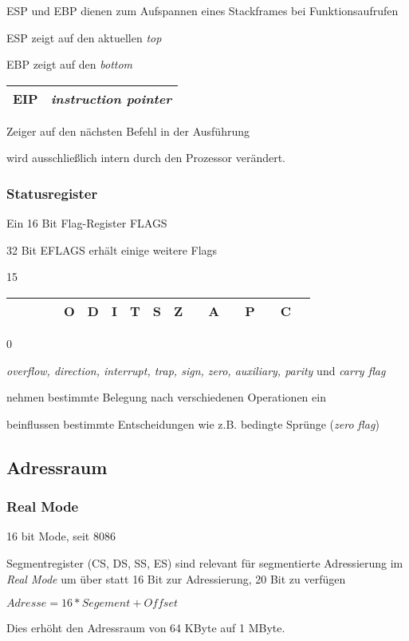 ESP und EBP dienen zum Aufspannen eines Stackframes bei Funktionsaufrufen

ESP zeigt auf den aktuellen \emph{top}

EBP zeigt auf den \emph{bottom}

\begin{tabular}{|c|l|}
\hline EIP & \emph{instruction pointer} \\
\hline
\end{tabular}

Zeiger auf den nächsten Befehl in der Ausführung

wird ausschließlich intern durch den Prozessor verändert.

\subsubsection{Statusregister}

Ein 16 Bit Flag-Register FLAGS

32 Bit EFLAGS erhält einige weitere Flags

{\small 15}
\begin{tabular}{|c|c|c|c|c|c|c|c|c|c|c|c|c|c|c|c|c|}
\hline & & & & O & D & I & T & S & Z & & A & & P & & C \\
\hline
\end{tabular}
{\small 0}

\emph{overflow, direction, interrupt, trap, sign, zero, auxiliary, parity}
und \emph{carry flag} 

nehmen bestimmte Belegung nach verschiedenen Operationen ein

beinflussen bestimmte Entscheidungen wie z.B. bedingte Sprünge (\emph{zero flag})


\subsection{Adressraum}

\subsubsection{Real Mode}

16 bit Mode, seit 8086

Segmentregister (CS, DS, SS, ES) sind relevant für segmentierte Adressierung im
\emph{Real Mode} um über statt 16 Bit zur Adressierung, 20 Bit zu verfügen

$Adresse = 16 * Segement + Offset$

Dies erhöht den Adressraum von 64 KByte auf 1 MByte.


